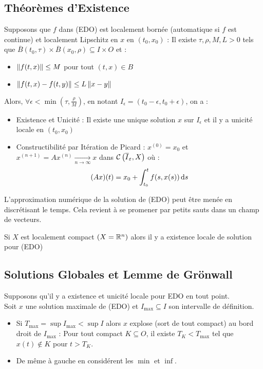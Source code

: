 \documentclass{cours}
\begin{document}
	\subsection{Théorèmes d'Existence}
	\begin{theorem}
Supposons que $f$ dans (EDO) est localement bornée (automatique si $f$ est continue) et localement Lipschitz en $x$ en $(t_{0}, x_{0})$ : Il existe $\tau, \rho, M, L > 0$ tels que $\overline{B}(t_{0}, \tau) \times \overline{B}(x_{0}, \rho) \subseteq I \times O$ et : 
		\begin{itemize}
			\item $\left\lVert f(t, x) \right\rVert \leq M$ pour tout $(t, x) \in B$
			\item $\left\lVert f(t, x) - f(t, y) \right\rVert \leq L\left\lVert x - y \right\rVert$
		\end{itemize}
	Alors, $\forall \epsilon < \min\left(\tau, \frac{\rho}{M}\right)$, en notant $I_{\epsilon} = \left(t_{0} - \epsilon, t_{0} + \epsilon\right)$, on a : 
		\begin{itemize}
			\item Existence et Unicité : Il existe une unique solution $x$ sur $I_{\epsilon}$ et il y a unicité locale en $(t_{0}, x_{0})$
			\item Constructibilité par Itération de Picard : $x^{(0)} = x_{0}$ et $x^{(n+1)} = Ax^{(n)} \xrightarrow[n \to \infty]{} x$ dans $\mathcal{C}\left(\overline{I}_{\varepsilon}, X\right)$ où :
				\[
					(Ax)(t) = x_{0} + \int_{t_{0}}^{t} f(s, x(s)){\rm \, d} s
				\]
		\end{itemize}
	\end{theorem}

	\begin{remark}
		L'approximation numérique de la solution de (EDO) peut être menée en discrétisant le temps. Cela revient à se promener par petits sauts dans un champ de vecteurs.
	\end{remark}

	\begin{theorem}[de Peano]
		Si $X$ est localement compact $(X = \mathbb{R}^{n})$ alors il y a existence locale de solution pour (EDO)
	\end{theorem}

	\subsection{Solutions Globales et Lemme de Grönwall}
	\begin{theorem}
		Supposons qu'il y a existence et unicité locale pour EDO en tout point. \\
		Soit $x$ une solution maximale de (EDO) et $I_{\max} \subseteq I$ son intervalle de définition. 
		\begin{itemize}
			\item Si $T_{\max} = \sup I_{\max} < \sup I$ alors $x$ explose (sort de tout compact) au bord droit de $I_{\max}$ : Pour tout compact $K \subseteq O$, il existe $T_{K} < T_{\max}$ tel que $x(t) \notin K$ pour $t > T_{K}$.
			\item De même à gauche en considérent les $\min$ et $\inf$. 
		\end{itemize}
	\end{theorem}
\end{document}
